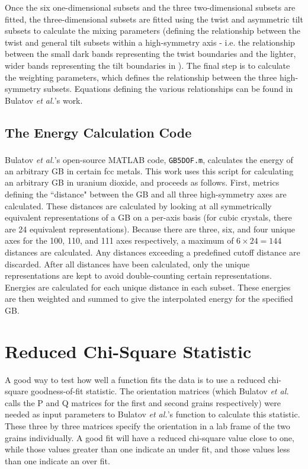 \documentclass[twoside,senior]{BYUPhys}
\begin{document}
Once the six one-dimensional subsets and the three two-dimensional subsets are fitted, the three-dimensional subsets are fitted using the twist and asymmetric tilt subsets to calculate the mixing parameters (defining the relationship between the twist and general tilt subsets within a high-symmetry axis - i.e. the relationship between the small dark bands representing the twist boundaries and the lighter, wider bands representing the tilt boundaries in ).  The final step is to calculate the weighting parameters, which defines the relationship between the three high-symmetry subsets.  Equations defining the various relationships can be found in Bulatov \emph{et al.}'s work.

\subsection{The Energy Calculation Code\label{code:energyCalc}}
Bulatov \emph{et al.}'s open-source MATLAB\textsuperscript{\textregistered} code\cite{bulatov2014}, \lstinline!GB5DOF.m!, calculates the energy of an arbitrary GB in certain fcc metals. This work uses this script for calculating an arbitrary GB in uranium dioxide, and proceeds as follows.  First, metrics defining the ``distance" between the GB and all three high-symmetry axes are calculated.  These distances are calculated by looking at all symmetrically equivalent representations of a GB on a per-axis basis (for cubic crystals, there are 24 equivalent representations\cite{stokes2007}).  Because there are three, six, and four unique axes for the \textlangle{}100\textrangle{}, \textlangle{}110\textrangle{}, and \textlangle{}111\textrangle{} axes respectively, a maximum of $6\times24=144$ distances are calculated.  Any distances exceeding a predefined cutoff distance are discarded.  After all distances have been calculated, only the unique representations are kept to avoid double-counting certain representations.\cite{bulatov2014}  Energies are calculated for each unique distance in each subset.  These energies are then weighted and summed to give the interpolated energy for the specified GB.

\section{Reduced Chi-Square Statistic\label{methods:chi2}}
A good way to test how well a function fits the data is to use a reduced chi-square goodness-of-fit statistic.\cite{bevington2003}  The orientation matrices (which Bulatov \emph{et al.} calls the P and Q matrices for the first and second grains respectively) were needed as input parameters to Bulatov \emph{et al.}'s function to calculate this statistic.  These three by three matrices specify the orientation in a lab frame of the two grains individually. A good fit will have a reduced chi-square value close to one, while those values greater than one indicate an under fit, and those values less than one indicate an over fit.\cite{bevington2003}
\end{document}
